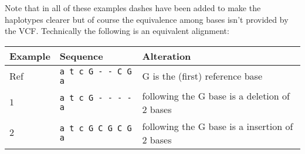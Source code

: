 \documentclass[8pt]{article}
\begin{document}
Note that in all of these examples dashes have been added to make the haplotypes clearer but of course the equivalence among bases isn't provided by the VCF. Technically the following is an equivalent alignment:

\vspace{0.3cm}
\begin{tabular}{ | l | l | l | }
\hline
Example & Sequence & Alteration \\ \hline
Ref & \verb|a t c G - - C G a| & G is the (first) reference base \\ \hline
$1$ & \verb|a t c G - - - - a| & following the G base is a deletion of 2 bases \\ \hline
$2$ & \verb|a t c G C G C G a| & following the G base is a insertion of 2 bases \\ \hline
\end{tabular}
\end{document}
